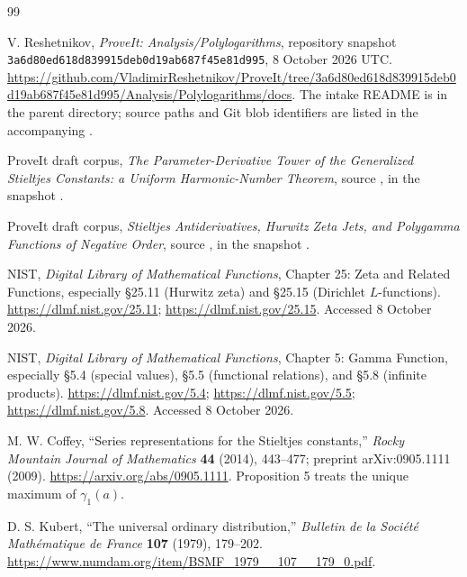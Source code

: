 \clearpage
{}
{}
\begingroup
\small
\setlength{\parskip}{0pt}
\begin{thebibliography}{99}
\setlength{\itemsep}{4pt}
\raggedright

V. Reshetnikov, \emph{ProveIt: Analysis/Polylogarithms},
repository snapshot
\texttt{3a6d80ed618d839915deb0d19ab687f45e81d995},
8 October 2026 UTC.
\url{https://github.com/VladimirReshetnikov/ProveIt/tree/3a6d80ed618d839915deb0d19ab687f45e81d995/Analysis/Polylogarithms/docs}.
The intake README is in the parent directory; source paths and Git
blob identifiers are listed in the accompanying .

ProveIt draft corpus, \emph{The Parameter-Derivative Tower of the
Generalized Stieltjes Constants: a Uniform Harmonic-Number Theorem}, source
,
in the snapshot \cite{RepoSnapshot}.

ProveIt draft corpus, \emph{Stieltjes Antiderivatives, Hurwitz Zeta Jets,
and Polygamma Functions of Negative Order}, source
,
in the snapshot \cite{RepoSnapshot}.

NIST, \emph{Digital Library of Mathematical Functions},
Chapter 25: Zeta and Related Functions, especially
\S25.11 (Hurwitz zeta) and \S25.15 (Dirichlet $L$-functions).
\url{https://dlmf.nist.gov/25.11};
\url{https://dlmf.nist.gov/25.15}.
Accessed 8 October 2026.

NIST, \emph{Digital Library of Mathematical Functions},
Chapter 5: Gamma Function, especially \S5.4 (special values),
\S5.5 (functional relations), and \S5.8 (infinite products).
\url{https://dlmf.nist.gov/5.4};
\url{https://dlmf.nist.gov/5.5};
\url{https://dlmf.nist.gov/5.8}.
Accessed 8 October 2026.

M. W. Coffey, “Series representations for the Stieltjes constants,”
\emph{Rocky Mountain Journal of Mathematics} \textbf{44} (2014),
443--477; preprint arXiv:0905.1111 (2009).
\url{https://arxiv.org/abs/0905.1111}.
Proposition 5 treats the unique maximum of $\gamma_1(a)$.

D. S. Kubert, “The universal ordinary distribution,”
\emph{Bulletin de la Soci\'et\'e Math\'ematique de France}
\textbf{107} (1979), 179--202.
\url{https://www.numdam.org/item/BSMF_1979__107__179_0.pdf}.


\end{thebibliography}
